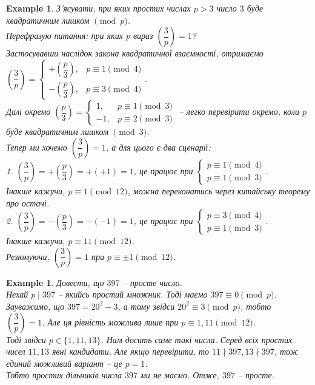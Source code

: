 \documentclass[a4paper, 14pt]{extarticle}
\theoremstyle{theoremdd}
\theoremstyle{theoremdd}
\theoremstyle{theoremdd}
\theoremstyle{theoremdd}
\newtheorem{example}[theorem]{Example}
\theoremstyle{theoremdd}
\theoremstyle{theoremdd}
\theoremstyle{theoremdd}
\theoremstyle{theoremdd}
\begin{document}
\begin{example}
З'ясувати, при яких простих числах $p>3$ число $3$ буде квадратичним лишком $\pmod p$.\\
Перефразую питання: при яких $p$ вираз $\left( \dfrac{3}{p} \right) = 1$?\\
Застосувавши наслідок закона квадратичної взаємності, отримаємо\\
$\left( \dfrac{3}{p} \right) = \begin{cases} +\left( \dfrac{p}{3} \right), & p \equiv 1 \pmod 4 \\ -\left(\dfrac{p}{3}\right), & p \equiv 3 \pmod 4 \end{cases}$.\\
Далі окремо $\left( \dfrac{p}{3} \right) = \begin{cases} 1, & p \equiv 1 \pmod 3 \\ -1, & p \equiv 2 \pmod 3 \end{cases}$ -- легко перевірити окремо, коли $p$ буде квадратичним лишком $\pmod 3$.\\
Тепер ми хочемо $\left( \dfrac{3}{p} \right) = 1$, а для цього є два сценарії:\\
1. $\left( \dfrac{3}{p} \right) = +\left( \dfrac{p}{3} \right) = +(+1) = 1$, це працює при $\begin{cases} p \equiv 1 \pmod 4 \\ p \equiv 1 \pmod 3 \end{cases}$.\\ Інакше кажучи, $p \equiv 1 \pmod {12}$, можна переконатись через китайську теорему про остачі.\\
2. $\left( \dfrac{3}{p} \right) = -\left( \dfrac{p}{3} \right) = -(-1) = 1$, це працює при $\begin{cases} p \equiv 3 \pmod 4 \\ p \equiv 1 \pmod 3 \end{cases}$. \\Інакше кажучи, $p \equiv 11 \pmod {12}$.\\
Резюмуючи, $\left( \dfrac{3}{p} \right) = 1$ при $p \equiv \pm 1 \pmod {12}$.
\end{example}

\begin{example}
Довести, що $397$ -- просте число.\\
Нехай $p \mid 397$ -- якийсь простий множник. Тоді маємо $397 \equiv 0 \pmod p$.\\
Зауважимо, що $397 = 20^2-3$, а тому звідси $20^2 \equiv 3 \pmod p$, тобто\\
$\left( \dfrac{3}{p} \right) = 1$. Але ця рівність можлива лише при $p \equiv 1,11 \pmod {12}$.\\
Тоді звідси $p \in \{1,11,13\}$. Нам досить саме такі числа. Серед всіх простих чисел $11,13$ явні кандидати. Але якщо перевірити, то $11 \nmid 397, 13 \nmid 397$, тож єдиний можливий варіант -- це $p = 1$.\\
Тобто простих дільників числа $397$ ми не маємо. Отже, $397$ -- просте.
\end{example}
\end{document}
